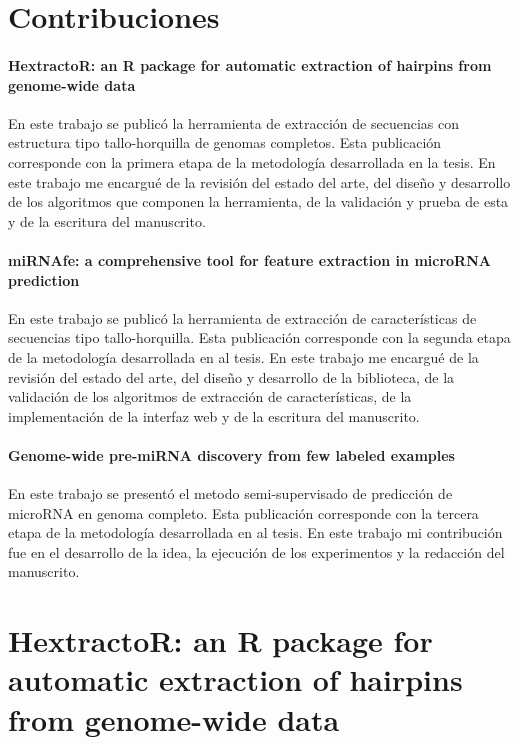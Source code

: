 \begin{appendices}
	\chapter{Contribuciones}
	\subsubsection*{HextractoR: an R package for automatic extraction of hairpins from genome-wide data}
	En este trabajo se publicó la herramienta de extracción de secuencias con estructura tipo tallo-horquilla de genomas completos. Esta publicación
	corresponde con la primera etapa de la metodología desarrollada en la tesis. En este trabajo me encargué de la revisión del estado del arte, del diseño
	y desarrollo de los algoritmos que componen la herramienta, de la validación y prueba de esta y de la escritura del manuscrito.

	\subsubsection*{miRNAfe: a comprehensive tool for feature extraction in microRNA prediction}
	En este trabajo se publicó la herramienta de extracción de características de secuencias tipo tallo-horquilla. Esta publicación corresponde con la segunda
	etapa de la metodología desarrollada en al tesis. En este trabajo me encargué de la revisión del estado del arte, del diseño y desarrollo de la biblioteca,
	de la validación de los algoritmos de extracción de características, de la implementación de la interfaz web y de la escritura del manuscrito.

	\subsubsection*{Genome-wide pre-miRNA discovery from few labeled examples}
	En este trabajo se presentó el metodo semi-supervisado de predicción de microRNA en genoma completo. Esta publicación corresponde con la tercera etapa de
	la metodología desarrollada en al tesis. En este trabajo mi contribución fue en el desarrollo de la idea, la ejecución de los experimentos y la redacción
	del manuscrito.


	\chapter{HextractoR: an R package for automatic extraction of hairpins from genome-wide data}
	\label{sec:hextractor}
	

\end{appendices}

